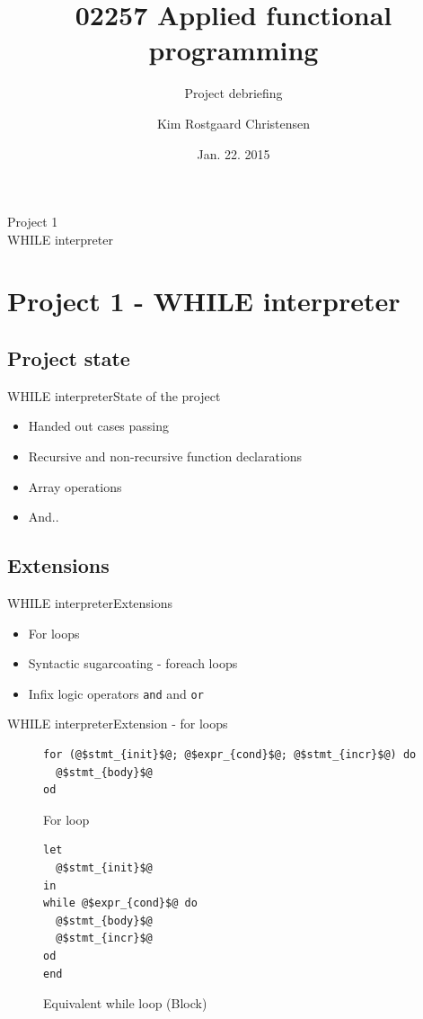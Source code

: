 \documentclass{beamer}
\title{02257 Applied functional programming}
\subtitle{Project debriefing}
\author{Kim Rostgaard Christensen}
\institute[Techical University of Denmark] %
{
  
  DTU Compute\\
  Techical University of Denmark}
\date{Jan. 22. 2015}
\begin{document}
\begin{frame}
  \titlepage
\end{frame}

\begin{frame}[plain,c]
\begin{center}
\Huge Project 1\\
\vspace{5mm}
\Large WHILE interpreter
\end{center}
\end{frame}

\section{Project 1 - WHILE interpreter}
\subsection{Project state}

\begin{frame}{WHILE interpreter}{State of the project}
  \begin{itemize}
  \item {
    Handed out cases passing
  }
  \item {
    Recursive and non-recursive function declarations
  }
  \item {
    Array operations
  }
  \pause
  \item {
    And..
  }
  \end{itemize}
\end{frame}

\subsection{Extensions}
\begin{frame}{WHILE interpreter}{Extensions}
  \begin{itemize}
  \item {
    For loops
  }
  \item {
    Syntactic sugarcoating - foreach loops
  }
  \item {
    Infix logic operators \alert{\texttt{and}} and \alert{\texttt{or}}
  }
  \end{itemize}
\end{frame}

\begin{frame}[fragile]{WHILE interpreter}{Extension - for loops}

\begin{figure}
\begin{lstlisting}
for (@$stmt_{init}$@; @$expr_{cond}$@; @$stmt_{incr}$@) do
  @$stmt_{body}$@
od
\end{lstlisting}
\caption{For loop}
\end{figure}

\begin{figure}
\begin{lstlisting}
let
  @$stmt_{init}$@
in
while @$expr_{cond}$@ do 
  @$stmt_{body}$@
  @$stmt_{incr}$@
od
end
\end{lstlisting}
\caption{Equivalent while loop (Block)}
\end{figure}
\end{frame}
\end{document}
